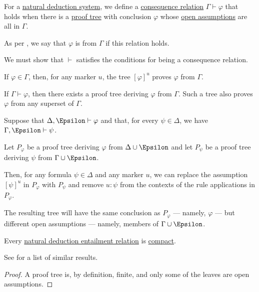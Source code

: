\begin{definition}\label{def:natural_deduction_entailment}
  For a \hyperref[def:propositional_natural_deduction_system]{natural deduction system}, we define a \hyperref[def:consequence_relation]{consequence relation} \( \Gamma \vdash \varphi \) that holds when there is a \hyperref[def:natural_deduction_proof_tree]{proof tree} with conclusion \( \varphi \) whose \hyperref[def:natural_deduction_open_assumptions]{open assumptions} are all in \( \Gamma \).

  As per , we say that \( \varphi \) is  from \( \Gamma \) if this relation holds.
\end{definition}
\begin{defproof}
  We must show that \( {\vdash} \) satisfies the conditions for being a consequence relation.

   If \( \varphi \in \Gamma \), then, for any marker \( u \), the tree \( [\varphi]^u \) proves \( \varphi \) from \( \Gamma \).

   If \( \Gamma \vdash \varphi \), then there exists a proof tree deriving \( \varphi \) from \( \Gamma \). Such a tree also proves \( \varphi \) from any superset of \( \Gamma \).

   Suppose that \( \Delta, \Epsilon \vdash \varphi \) and that, for every \( \psi \in \Delta \), we have \( \Gamma, \Epsilon \vdash \psi \).

  Let \( P_\varphi \) be a proof tree deriving \( \varphi \) from \( \Delta \cup \Epsilon \) and let \( P_\psi \) be a proof tree deriving \( \psi \) from \( \Gamma \cup \Epsilon \).

  Then, for any formula \( \psi \in \Delta \) and any marker \( u \), we can replace the assumption \( [\psi]^u \) in \( P_\varphi \) with \( P_\psi \) and remove \( u: \psi \) from the contexts of the rule applications in \( P_\varphi \).

  The resulting tree will have the same conclusion as \( P_\varphi \) --- namely, \( \varphi \) --- but different open assumptions --- namely, members of \( \Gamma \cup \Epsilon \).
\end{defproof}

\begin{proposition}\label{thm:propositional_natural_deduction_entailment_compact}
  Every \hyperref[def:natural_deduction_entailment]{natural deduction entailment relation} is \hyperref[def:consequence_relation/compactness]{compact}.
\end{proposition}
\begin{comments}
  \item See  for a list of similar results.
\end{comments}
\begin{proof}
  A proof tree is, by definition, finite, and only some of the leaves are open assumptions.
\end{proof}

